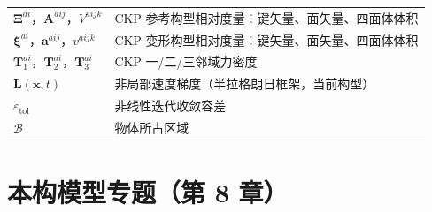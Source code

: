 \begin{longtable}{@{}p{4.8cm}>{\raggedright\arraybackslash}p{10.2cm}@{}}
  $\boldsymbol{\Xi}^{ai}$，$\mathbf{A}^{aij}$，$V^{aijk}$ & CKP 参考构型相对度量：键矢量、面矢量、四面体体积 \\
  $\boldsymbol{\xi}^{ai}$，$\mathbf{a}^{aij}$，$v^{aijk}$ & CKP 变形构型相对度量：键矢量、面矢量、四面体体积 \\
  $\mathbf{T}_1^{ai}$，$\mathbf{T}_2^{ai}$，$\mathbf{T}_3^{ai}$ & CKP 一/二/三邻域力密度 \\
  $\mathbf{L}(\mathbf{x},t)$ & 非局部速度梯度（半拉格朗日框架，当前构型） \\
  $\varepsilon_{\mathrm{tol}}$ & 非线性迭代收敛容差 \\
  $\mathcal{B}$ & 物体所占区域 \\
\end{longtable}

\section*{本构模型专题（第 8 章）}

